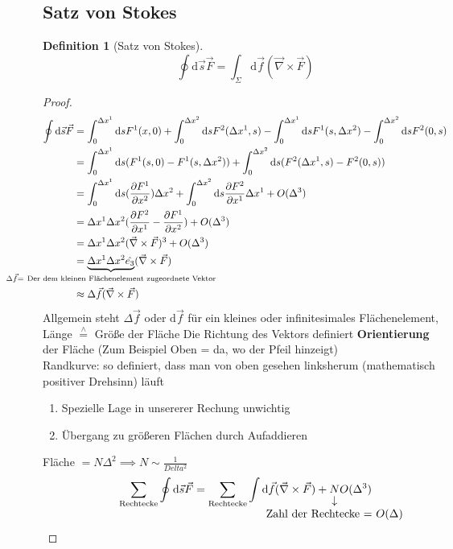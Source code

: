 \documentclass[a4paper]{scrartcl}
\newcommand{\estimates}{\overset{\scriptscriptstyle\wedge}{=}}
\renewcommand{\d}{\mathrm{d}}
\renewcommand{\v}[1]{\vec{#1}}
\theoremstyle{definition}
\newtheorem{defn}{Definition}
\theoremstyle{plain}
\theoremstyle{remark}
\theoremstyle{remark}
\begin{document}
\subsection{Satz von Stokes}
\label{sec-4-5}
\begin{defn}[Satz von Stokes]
\[\oint \d \v s\v F = \int_{\Sigma} \d \v f (\v \nabla \times \v F)\]
\end{defn}
\begin{proof}
\begin{align*}
\oint \d\v s\v F &= \int_0^{\Delta x^1}\d s F^1(x,0) + \int_0^{\Delta x^2}\d s F^2(\Delta x^1, s) - \int_0^{\Delta x^1}\d s F^1(s, \Delta x^2) - \int_0^{\Delta x^2}\d s F^2(0,s) \\
&= \int_0^{\Delta x^1}\d s(F^1(s,0) - F^1(s,\Delta x^2)) + \int_0^{\Delta x^2}\d s(F^2(\Delta x^1, s) - F^2(0,s)) \\
&= \int_0^{\Delta x^1}\d s(\frac{\partial F^1}{\partial x^2})\Delta x^2 + \int_0^{\Delta x^2}\d s \frac{\partial F^2}{\partial x^1}\Delta x^1 + O(\Delta^3) \\
&= \Delta x^1 \Delta x^2(\frac{\partial F^2}{\partial x^1} - \frac{\partial F^1}{\partial x^2}) + O(\Delta^3) \\
&= \Delta x^1 \Delta x^2(\v\nabla \times \v F)^3 + O(\Delta^3) \\
&= \underbrace{\Delta x^1 \Delta x^2 \hat{e_3}}_{\mathclap{\Delta \v f = ~\text{Der dem kleinen Flächenelement zugeordnete Vektor}}} (\v\nabla \times \v F) \\
&\approx \Delta \v f(\v \nabla \times \v F)
\end{align*}
Allgemein steht $\Delta \v f$ oder $\d \v f$ für ein kleines oder infinitesimales Flächenelement, Länge $\estimates$ Größe der Fläche
Die Richtung des Vektors definiert \textbf{Orientierung} der Fläche (Zum Beispiel Oben = da, wo der Pfeil hinzeigt) \\
   Randkurve: so definiert, dass man von oben gesehen linksherum (mathematisch positiver Drehsinn) läuft
\begin{enumerate}
\item Spezielle Lage in unsererer Rechung unwichtig
\item Übergang zu größeren Flächen durch Aufaddieren
\end{enumerate}
Fläche $= N\Delta ^2 \implies N\sim \frac{1}{Delta^2}$
\begin{align*}
\sum_{\text{Rechtecke}} \oint\d \v s\v F = \sum_{\text{Rechtecke}} \int\d\v f(\v\nabla \times \v F) + \underarrow[N]{Zahl der Rechtecke = $O(\Delta)$} O(\Delta^3) \\

\end{align*}
\end{proof}
\end{document}
